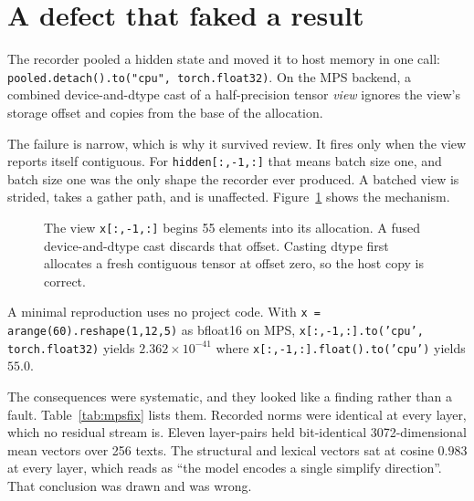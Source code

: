 \documentclass[twocolumn,10pt,a4paper]{article}
\newcommand{\code}[1]{\texttt{\small #1}}
\begin{document}
\section{A defect that faked a result}
\label{sec:mps}

The recorder pooled a hidden state and moved it to host memory in one call:
\code{pooled.detach().to("cpu", torch.float32)}. On the MPS backend, a combined
device-and-dtype cast of a half-precision tensor \emph{view} ignores the view's
storage offset and copies from the base of the allocation.

The failure is narrow, which is why it survived review. It fires only when the
view reports itself contiguous. For \code{hidden[:,-1,:]} that means batch size
one, and batch size one was the only shape the recorder ever produced. A batched
view is strided, takes a gather path, and is unaffected. Figure~\ref{fig:offset}
shows the mechanism.

\begin{figure}[t]
\centering
{}
\caption{The view \code{x[:,-1,:]} begins 55 elements into its allocation. A
fused device-and-dtype cast discards that offset. Casting dtype first allocates a
fresh contiguous tensor at offset zero, so the host copy is correct.}
\label{fig:offset}
\end{figure}

A minimal reproduction uses no project code. With
\code{x = arange(60).reshape(1,12,5)} as bfloat16 on MPS,
\code{x[:,-1,:].to('cpu', torch.float32)} yields $2.362\times10^{-41}$ where
\code{x[:,-1,:].float().to('cpu')} yields $55.0$.

The consequences were systematic, and they looked like a finding rather than a
fault. Table~\ref{tab:mpsfix} lists them. Recorded norms were identical at every
layer, which no residual stream is. Eleven layer-pairs held bit-identical
3072-dimensional mean vectors over 256 texts. The structural and lexical vectors
sat at cosine $0.983$ at every layer, which reads as ``the model encodes a single
simplify direction''. That conclusion was drawn and was wrong.
\end{document}
